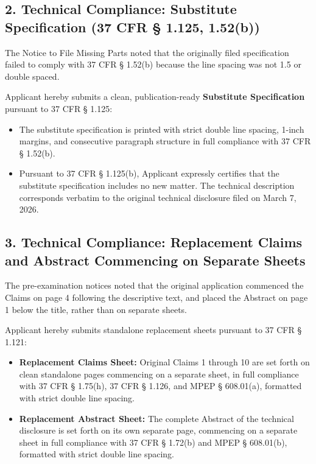 \documentclass[11pt,letterpaper]{article}
\begin{document}
\subsection*{2. Technical Compliance: Substitute Specification (37 CFR \S{} 1.125, 1.52(b))}

The Notice to File Missing Parts noted that the originally filed specification failed to comply with 37 CFR \S{} 1.52(b) because the line spacing was not 1.5 or double spaced.

Applicant hereby submits a clean, publication-ready \textbf{Substitute Specification} pursuant to 37 CFR \S{} 1.125:
\begin{itemize}[leftmargin=2em, itemsep=2pt, parsep=0pt]
    \item The substitute specification is printed with strict double line spacing, 1-inch margins, and consecutive paragraph structure in full compliance with 37 CFR \S{} 1.52(b).
    \item Pursuant to 37 CFR \S{} 1.125(b), Applicant expressly certifies that the substitute specification includes no new matter. The technical description corresponds verbatim to the original technical disclosure filed on March 7, 2026.
\end{itemize}

\subsection*{3. Technical Compliance: Replacement Claims and Abstract Commencing on Separate Sheets}

The pre-examination notices noted that the original application commenced the Claims on page 4 following the descriptive text, and placed the Abstract on page 1 below the title, rather than on separate sheets.

Applicant hereby submits standalone replacement sheets pursuant to 37 CFR \S{} 1.121:
\begin{itemize}[leftmargin=2em, itemsep=2pt, parsep=0pt]
    \item \textbf{Replacement Claims Sheet:} Original Claims 1 through 10 are set forth on clean standalone pages commencing on a separate sheet, in full compliance with 37 CFR \S{} 1.75(h), 37 CFR \S{} 1.126, and MPEP \S{} 608.01(a), formatted with strict double line spacing.
    \item \textbf{Replacement Abstract Sheet:} The complete Abstract of the technical disclosure is set forth on its own separate page, commencing on a separate sheet in full compliance with 37 CFR \S{} 1.72(b) and MPEP \S{} 608.01(b), formatted with strict double line spacing.
\end{itemize}
\end{document}
